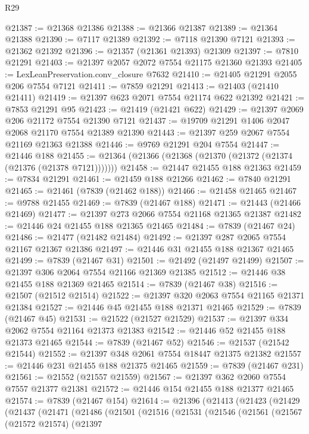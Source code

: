 \begin{lexlean}{R29}
\begin{coremodule}
@21387 := @21368 @21386
@21388 := @21366 @21387
@21389 := @21364 @21388
@21390 := @7117 @21389
@21392 := @7118 @21390 @7121
@21393 := @21362 @21392
@21396 := @21357 (@21361 @21393) @21309
@21397 := @7810 @21291
@21403 := @21397 @2057 @2072 @7554 @21175 @21360 @21393
@21405 := LexLeanPreservation.conv_closure @7632
@21410 := @21405 @21291 @2055 @206 @7554 @7121
@21411 := @7859 @21291
@21413 := @21403 (@21410 @21411)
@21419 := @21397 @623 @2071 @7554 @21174 @622 @21392
@21421 := @7853 @21291 @95
@21423 := @21419 (@21421 @622)
@21429 := @21397 @2069 @206 @21172 @7554 @21390 @7121
@21437 := @19709 @21291 @1406 @2047 @2068 @21170 @7554 @21389 @21390
@21443 := @21397 @259 @2067 @7554 @21169 @21363 @21388
@21446 := @9769 @21291 @204 @7554
@21447 := @21446 @188
@21455 := @21364 (@21366 (@21368 (@21370 (@21372 (@21374 (@21376 (@21378 @7121)))))))
@21458 := @21447 @21455 @188 @21363
@21459 := @7834 @21291
@21461 := @21459 @188 @21266
@21462 := @7840 @21291
@21465 := @21461 (@7839 (@21462 @188))
@21466 := @21458 @21465
@21467 := @9788 @21455
@21469 := @7839 (@21467 @188)
@21471 := @21443 (@21466 @21469)
@21477 := @21397 @273 @2066 @7554 @21168 @21365 @21387
@21482 := @21446 @24 @21455 @188 @21365 @21465
@21484 := @7839 (@21467 @24)
@21486 := @21477 (@21482 @21484)
@21492 := @21397 @287 @2065 @7554 @21167 @21367 @21386
@21497 := @21446 @31 @21455 @188 @21367 @21465
@21499 := @7839 (@21467 @31)
@21501 := @21492 (@21497 @21499)
@21507 := @21397 @306 @2064 @7554 @21166 @21369 @21385
@21512 := @21446 @38 @21455 @188 @21369 @21465
@21514 := @7839 (@21467 @38)
@21516 := @21507 (@21512 @21514)
@21522 := @21397 @320 @2063 @7554 @21165 @21371 @21384
@21527 := @21446 @45 @21455 @188 @21371 @21465
@21529 := @7839 (@21467 @45)
@21531 := @21522 (@21527 @21529)
@21537 := @21397 @334 @2062 @7554 @21164 @21373 @21383
@21542 := @21446 @52 @21455 @188 @21373 @21465
@21544 := @7839 (@21467 @52)
@21546 := @21537 (@21542 @21544)
@21552 := @21397 @348 @2061 @7554 @18447 @21375 @21382
@21557 := @21446 @231 @21455 @188 @21375 @21465
@21559 := @7839 (@21467 @231)
@21561 := @21552 (@21557 @21559)
@21567 := @21397 @362 @2060 @7554 @7557 @21377 @21381
@21572 := @21446 @154 @21455 @188 @21377 @21465
@21574 := @7839 (@21467 @154)
@21614 := @21396
    (@21413
      (@21423
        (@21429
          (@21437
            (@21471
              (@21486
                (@21501
                  (@21516
                    (@21531
                      (@21546
                        (@21561
                          (@21567
                            (@21572 @21574)
                            (@21397

\end{coremodule}
\end{lexlean}
